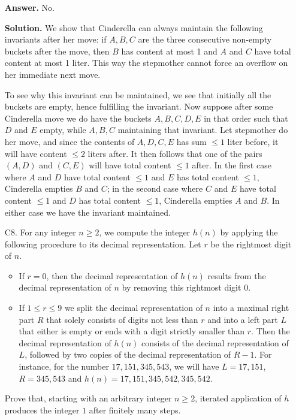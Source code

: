 \documentclass[11pt,a4paper]{article}
\begin{document}
\begin{enumerate}
    	\textbf{Answer.} No. 
    	
    	\textbf{Solution.} We show that Cinderella can always maintain the following invariants after her move: 
    	if $A, B, C$ are the three consecutive non-empty buckets after the move, then $B$ has content at most 1 and $A$ and $C$ have total content at most 1 liter. 
    	This way the stepmother cannot force an overflow on her immediate next move. 
    	
    	To see why this invariant can be maintained, we see that initially all the buckets are empty, hence fulfilling the invariant. 
    	Now suppose after some Cinderella move we do have the buckets $A, B, C, D, E$ in that order such that $D$ and $E$ empty, while $A, B, C$ maintaining that invariant. 
    	Let stepmother do her move, and since the contents of $A, D, C, E$ has sum $\le 1$ liter before, it will have content $\le 2$ liters after. 
    	It then follows that one of the pairs $(A, D)$ and $(C, E)$ will have total content $\le 1$ after. 
    	In the first case where $A$ and $D$ have total content $\le 1$ and $E$ has total content $\le 1$, Cinderella empties $B$ and $C$; 
    	in the second case where $C$ and $E$ have total content $\le 1$ and $D$ has total content $\le 1$, Cinderella empties $A$ and $B$. 
    	In either case we have the invariant maintained. 
    	
    	\item[C8.]
    	For any integer $n\geq 2$, we compute the integer $h(n)$ by applying the following procedure to its decimal representation. Let $r$ be the rightmost digit of $n$.
    	\begin{itemize}
    		\item If $r=0$, then the decimal representation of $h(n)$ results from the decimal representation of $n$ by removing this rightmost digit $0$.
    		
    		\item If $1\leq r \leq 9$ we split the decimal representation of $n$ into a maximal right part $R$ that solely consists of digits not less than $r$ and into a left part $L$ that either is empty or ends with a digit strictly smaller than $r$. Then the decimal representation of $h(n)$ consists of the decimal representation of $L$, followed by two copies of the decimal representation of $R-1$. For instance, for the number $17,151,345,543$, we will have $L=17,151$, $R=345,543$ and $h(n)=17,151,345,542,345,542$.
    	\end{itemize}
        
        Prove that, starting with an arbitrary integer $n\geq 2$, iterated application of $h$ produces the integer $1$ after finitely many steps.
        

\end{enumerate}
\end{document}
